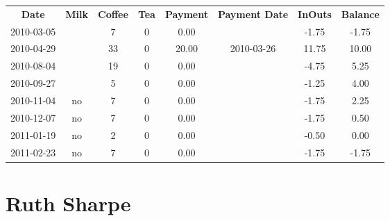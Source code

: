 \begin{center}
\begin{tabular}{cccccccc}
\textbf{Date} & \textbf{Milk} & \textbf{Coffee} & \textbf{Tea} & \textbf{Payment} & \textbf{Payment Date} & \textbf{InOuts} & \textbf{Balance} \\
2010-03-05 &  &  7 & 0 &  0.00 &  & -1.75 & -1.75\\ 
2010-04-29 &  & 33 & 0 & 20.00 & 2010-03-26 & 11.75 & 10.00\\ 
2010-08-04 &  & 19 & 0 &  0.00 &  & -4.75 &  5.25\\ 
2010-09-27 &  &  5 & 0 &  0.00 &  & -1.25 &  4.00\\ 
2010-11-04 & no &  7 & 0 &  0.00 &  & -1.75 &  2.25\\ 
2010-12-07 & no &  7 & 0 &  0.00 &  & -1.75 &  0.50\\ 
2011-01-19 & no &  2 & 0 &  0.00 &  & -0.50 &  0.00\\ 
2011-02-23 & no &  7 & 0 &  0.00 &  & -1.75 & -1.75
\end{tabular}
\end{center}

\section{Ruth Sharpe}

